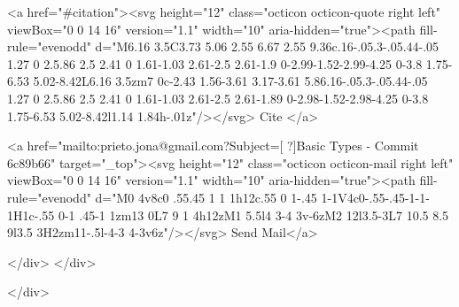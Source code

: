       <a  href="#citation"><svg height="12" class="octicon octicon-quote right left" viewBox="0 0 14 16" version="1.1" width="10" aria-hidden="true"><path fill-rule="evenodd" d="M6.16 3.5C3.73 5.06 2.55 6.67 2.55 9.36c.16-.05.3-.05.44-.05 1.27 0 2.5.86 2.5 2.41 0 1.61-1.03 2.61-2.5 2.61-1.9 0-2.99-1.52-2.99-4.25 0-3.8 1.75-6.53 5.02-8.42L6.16 3.5zm7 0c-2.43 1.56-3.61 3.17-3.61 5.86.16-.05.3-.05.44-.05 1.27 0 2.5.86 2.5 2.41 0 1.61-1.03 2.61-2.5 2.61-1.89 0-2.98-1.52-2.98-4.25 0-3.8 1.75-6.53 5.02-8.42l1.14 1.84h-.01z"/></svg> Cite
      </a>

      <a href="mailto:prieto.jona@gmail.com?Subject=[ ?]Basic Types - Commit 6c89b66" target="_top"><svg height="12" class="octicon octicon-mail right left" viewBox="0 0 14 16" version="1.1" width="10" aria-hidden="true"><path fill-rule="evenodd" d="M0 4v8c0 .55.45 1 1 1h12c.55 0 1-.45 1-1V4c0-.55-.45-1-1-1H1c-.55 0-1 .45-1 1zm13 0L7 9 1 4h12zM1 5.5l4 3-4 3v-6zM2 12l3.5-3L7 10.5 8.5 9l3.5 3H2zm11-.5l-4-3 4-3v6z"/></svg> Send Mail</a>

    </div>
  </div>

</div>




